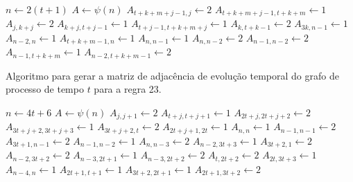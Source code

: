 \documentclass[12pt,a4paper]{article}
\begin{document}
\begin{algorithm}[H]
\begin{algorithmic}
    \STATE $n \leftarrow 2(t+1)$
    \STATE $A \leftarrow \psi(n)$
        \STATE $A_{t+k+m+j-1,j} \leftarrow 2$
        \STATE $A_{t+k+m+j-1,t+k+m} \leftarrow 1$
    \ENDFOR
            \STATE $A_{j,k+j} \leftarrow 2$
            \STATE $A_{k+j,t+j-1} \leftarrow 1$
        \ENDFOR
    \ENDIF
            \STATE $A_{t+j-1,t+k+m+j} \leftarrow 1$
        \ENDFOR
    \ENDIF
        \STATE $A_{k,t+k-1} \leftarrow 2$
    \ELSE
        \STATE $A_{3k,n-1} \leftarrow 1$
    \ENDIF
    \STATE $A_{n-2,n} \leftarrow 1$
    \STATE $A_{t+k+m-1,n} \leftarrow 1$
    \STATE $A_{n,n-1} \leftarrow 1$
    \STATE $A_{n,n-2} \leftarrow 2$
    \STATE $A_{n-1,n-2} \leftarrow 2$
    \STATE $A_{n-1,t+k+m} \leftarrow 1$
    \STATE $A_{n-2,t+k+m-1} \leftarrow 2$
\ENDIF
\end{algorithmic}
\end{algorithm}

\begin{algorithm}[H]
\caption{Algoritmo para gerar a matriz de adjacência de evolução temporal do
grafo de processo de tempo $t$ para a regra 23.}
\label{alg:r23}
\begin{algorithmic}
\STATE $n \leftarrow 4t+6$
\STATE $A \leftarrow \psi(n)$
        \STATE $A_{j,j+1} \leftarrow 2$
        \STATE $A_{t+j,t+j+1} \leftarrow 1$
        \STATE $A_{2t+j,2t+j+2} \leftarrow 2$
        \STATE $A_{3t+j+2,3t+j+3} \leftarrow 1$
    \ENDFOR
\ENDIF
{}
    \STATE $A_{3t+j+2,t} \leftarrow 2$
    \STATE $A_{2t+j+1,2t} \leftarrow 1$
\ENDFOR
\STATE $A_{n,n} \leftarrow 1$
\STATE $A_{n-1,n-1} \leftarrow 2$
\STATE $A_{3t+1,n-1} \leftarrow 2$
\STATE $A_{n-1,n-2} \leftarrow 1$
\STATE $A_{n,n-3} \leftarrow 2$
\STATE $A_{n-2,3t+3} \leftarrow 1$
\STATE $A_{3t+2,1} \leftarrow 2$
\STATE $A_{n-2,3t+2} \leftarrow 2$
\STATE $A_{n-3,2t+1} \leftarrow 1$
\STATE $A_{n-3,2t+2} \leftarrow 2$
\STATE $A_{t,2t+2} \leftarrow 2$
\STATE $A_{2t,3t+3} \leftarrow 1$
\STATE $A_{n-4,n} \leftarrow 1$
\STATE $A_{2t+1,t+1} \leftarrow 1$
\STATE $A_{3t+2,2t+1} \leftarrow 1$
\STATE $A_{2t+1,3t+2} \leftarrow 2$
\end{algorithmic}
\end{algorithm}
\end{document}
